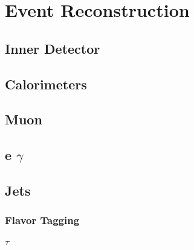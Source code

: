 \chapter{Event Reconstruction}\label{chap:reco}
	

	\section{Inner Detector}\label{sec:reco-ID}

	\section{Calorimeters}\label{sec:reco-calo}

	\section{Muon}\label{sec:reco-muon}

	\section{e $\gamma$}\label{sec:reco-egamma}

	\section{Jets}\label{sec:reco-jets}

		\subsection{Flavor Tagging}\label{ssec:flavor-tagging}

		\subsection{$\tau$}\label{ssec:reco-tau}

	\section{\Etm}\label{sec:reco-etmiss}
		